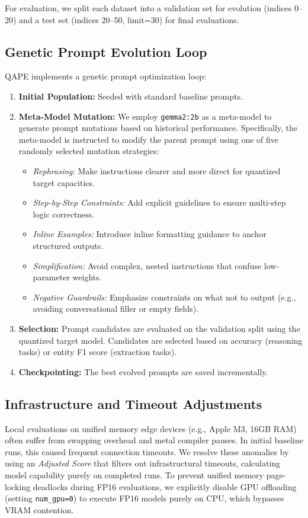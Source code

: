 \documentclass[11pt]{article}
\begin{document}
For evaluation, we split each dataset into a validation set for evolution (indices 0--20) and a test set (indices 20--50, limit=30) for final evaluations.

\subsection{Genetic Prompt Evolution Loop}
QAPE implements a genetic prompt optimization loop:
\begin{enumerate}
    \item \textbf{Initial Population:} Seeded with standard baseline prompts.
    \item \textbf{Meta-Model Mutation:} We employ \texttt{gemma2:2b} as a meta-model to generate prompt mutations based on historical performance. Specifically, the meta-model is instructed to modify the parent prompt using one of five randomly selected mutation strategies:
    \begin{itemize}
        \item \textit{Rephrasing:} Make instructions clearer and more direct for quantized target capacities.
        \item \textit{Step-by-Step Constraints:} Add explicit guidelines to ensure multi-step logic correctness.
        \item \textit{Inline Examples:} Introduce inline formatting guidance to anchor structured outputs.
        \item \textit{Simplification:} Avoid complex, nested instructions that confuse low-parameter weights.
        \item \textit{Negative Guardrails:} Emphasize constraints on what not to output (e.g., avoiding conversational filler or empty fields).
    \end{itemize}
    \item \textbf{Selection:} Prompt candidates are evaluated on the validation split using the quantized target model. Candidates are selected based on accuracy (reasoning tasks) or entity F1 score (extraction tasks).
    \item \textbf{Checkpointing:} The best evolved prompts are saved incrementally.
\end{enumerate}

\subsection{Infrastructure and Timeout Adjustments}
Local evaluations on unified memory edge devices (e.g., Apple M3, 16GB RAM) often suffer from swapping overhead and metal compiler pauses. In initial baseline runs, this caused frequent connection timeouts. We resolve these anomalies by using an \textit{Adjusted Score} that filters out infrastructural timeouts, calculating model capability purely on completed runs. To prevent unified memory page-locking deadlocks during FP16 evaluations, we explicitly disable GPU offloading (setting \texttt{num\_gpu=0}) to execute FP16 models purely on CPU, which bypasses VRAM contention.
\end{document}
